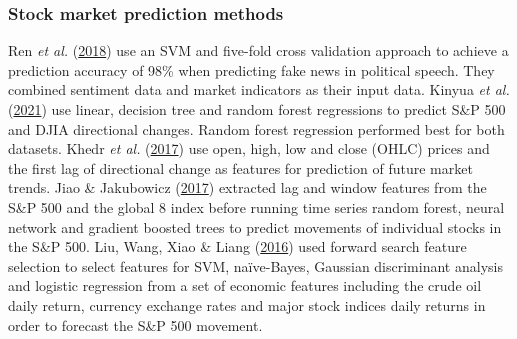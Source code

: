 \documentclass[11pt,preprint, authoryear]{elsarticle}
\numberwithin{equation}{section}
\numberwithin{figure}{section}
\numberwithin{table}{section}
\begin{document}
\hypertarget{stock-market-prediction-methods}{%
\subsubsection{\texorpdfstring{Stock market prediction methods
\label{stockPred}}{Stock market prediction methods }}\label{stock-market-prediction-methods}}

Ren \emph{et al.} (\protect\hyperlink{ref-ren2018forecasting}{2018}) use
an SVM and five-fold cross validation approach to achieve a prediction
accuracy of 98\% when predicting fake news in political speech. They
combined sentiment data and market indicators as their input data.
Kinyua \emph{et al.} (\protect\hyperlink{ref-kinyua2021analysis}{2021})
use linear, decision tree and random forest regressions to predict S\&P
500 and DJIA directional changes. Random forest regression performed
best for both datasets. Khedr \emph{et al.}
(\protect\hyperlink{ref-khedr2017predicting}{2017}) use open, high, low
and close (OHLC) prices and the first lag of directional change as
features for prediction of future market trends. Jiao \& Jakubowicz
(\protect\hyperlink{ref-jiao2017predicting}{2017}) extracted lag and
window features from the S\&P 500 and the global 8 index before running
time series random forest, neural network and gradient boosted trees to
predict movements of individual stocks in the S\&P 500. Liu, Wang, Xiao
\& Liang (\protect\hyperlink{ref-liu2016forecasting}{2016}) used forward
search feature selection to select features for SVM, naïve-Bayes,
Gaussian discriminant analysis and logistic regression from a set of
economic features including the crude oil daily return, currency
exchange rates and major stock indices daily returns in order to
forecast the S\&P 500 movement.
\end{document}
